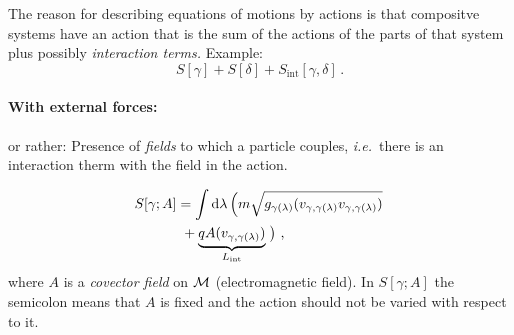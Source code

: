 \begin{note}
    The reason for describing equations of motions by actions is that compositve systems have
    an action that is the sum of the actions of the parts of that system plus possibly
    \textit{interaction terms.}
    Example:
    \begin{equation}
        S[\gamma] + S[\delta] + S_\text{int}[\gamma,\delta]\,.
    \end{equation}
\end{note}

\paragraph{With external forces:}
or rather: Presence of \textit{fields} to which a particle couples, \textit{i.e.}\ there
is an interaction therm with the field in the action.

\begin{example}
    \begin{align*}
        S[\gamma;A] &= \int\diff\lambda \left(m\sqrt{g_{\gamma(\lambda)} ( v_{\gamma, \gamma(\lambda)} v_{\gamma, \gamma(\lambda)})}\right.\\
        &~+\underbrace{q A(v_{\gamma, \gamma(\lambda)})}_{L_\text{int}}\left.\vphantom{\sqrt{g_{\gamma(\lambda)}}}\right)\,,
    \end{align*}
    where $A$ is a \textit{covector field} on $\mathcal{M}$ (electromagnetic field).
    In $S[\gamma;A]$ the semicolon means that $A$ is fixed and the action should not be varied with respect to it.
\end{example}

